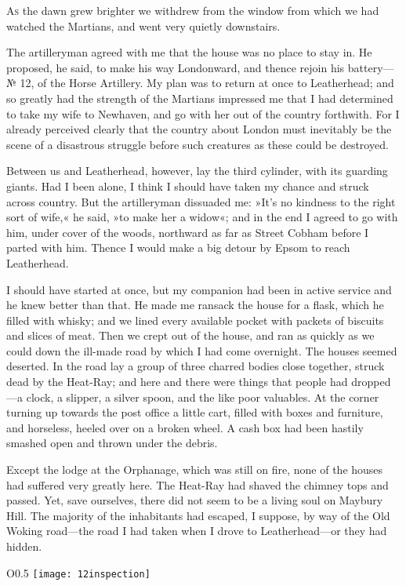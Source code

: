 


\lettrine[lines=4,findent=2pt]{A}{s} the dawn grew brighter we withdrew from the window from which we had watched the Martians, and went very quietly downstairs.

\zz
The artilleryman agreed with me that the house was no place to stay in. He proposed, he said, to make his way Londonward, and thence rejoin his battery—№ 12, of the Horse Artillery. My plan was to return at once to Leatherhead; and so greatly had the strength of the Martians impressed me that I had determined to take my wife to Newhaven, and go with her out of the country forthwith. For I already perceived clearly that the country about London must inevitably be the scene of a disastrous struggle before such creatures as these could be destroyed.

Between us and Leatherhead, however, lay the third cylinder, with its guarding giants. Had I been alone, I think I should have taken my chance and struck across country. But the artilleryman dissuaded me: »It's no kindness to the right sort of wife,« he said, »to make her a widow«; and in the end I agreed to go with him, under cover of the woods, northward as far as Street Cobham before I parted with him. Thence I would make a big detour by Epsom to reach Leatherhead.

I should have started at once, but my companion had been in active service and he knew better than that. He made me ransack the house for a flask, which he filled with whisky; and we lined every available pocket with packets of biscuits and slices of meat. Then we crept out of the house, and ran as quickly as we could down the ill-made road by which I had come overnight. The houses seemed deserted. In the road lay a group of three charred bodies close together, struck dead by the Heat-Ray; and here and there were things that people had dropped—a clock, a slipper, a silver spoon, and the like poor valuables. At the corner turning up towards the post office a little cart, filled with boxes and furniture, and horseless, heeled over on a broken wheel. A cash box had been hastily smashed open and thrown under the debris.

Except the lodge at the Orphanage, which was still on fire, none of the houses had suffered very greatly here. The Heat-Ray had shaved the chimney tops and passed. Yet, save ourselves, there did not seem to be a living soul on Maybury Hill. The majority of the inhabitants had escaped, I suppose, by way of the Old Woking road—the road I had taken when I drove to Leatherhead—or they had hidden.
\makeatletter
{}
{%

}{%
\begin{wrapfigure}{O}{0.5\textwidth}
\centering
\texttt{[image: 12inspection]}
\end{wrapfigure}
}
\makeatother


